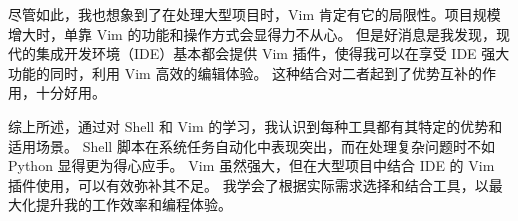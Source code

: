 \documentclass[16pt]{lzc}
\begin{document}
        尽管如此，我也想象到了在处理大型项目时，Vim 肯定有它的局限性。项目规模增大时，单靠 Vim 的功能和操作方式会显得力不从心。
        但是好消息是我发现，现代的集成开发环境（IDE）基本都会提供 Vim 插件，使得我可以在享受 IDE 强大功能的同时，利用 Vim 高效的编辑体验。
        这种结合对二者起到了优势互补的作用，十分好用。

        综上所述，通过对 Shell 和 Vim 的学习，我认识到每种工具都有其特定的优势和适用场景。
        Shell 脚本在系统任务自动化中表现突出，而在处理复杂问题时不如 Python 显得更为得心应手。
        Vim 虽然强大，但在大型项目中结合 IDE 的 Vim 插件使用，可以有效弥补其不足。
        我学会了根据实际需求选择和结合工具，以最大化提升我的工作效率和编程体验。
\end{document}
